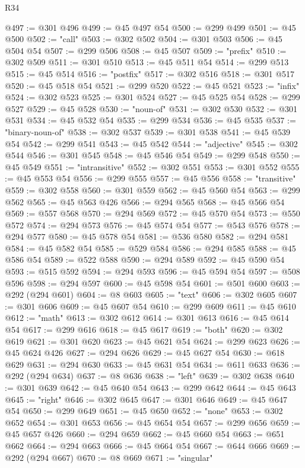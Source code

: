 \begin{lexlean}{R34}
\begin{coremodule}
@497 := @301 @496
@499 := @45 @497 @54
@500 := @299 @499
@501 := @45 @500
@502 := "call"
@503 := @302 @502
@504 := @301 @503
@506 := @45 @504 @54
@507 := @299 @506
@508 := @45 @507
@509 := "prefix"
@510 := @302 @509
@511 := @301 @510
@513 := @45 @511 @54
@514 := @299 @513
@515 := @45 @514
@516 := "postfix"
@517 := @302 @516
@518 := @301 @517
@520 := @45 @518 @54
@521 := @299 @520
@522 := @45 @521
@523 := "infix"
@524 := @302 @523
@525 := @301 @524
@527 := @45 @525 @54
@528 := @299 @527
@529 := @45 @528
@530 := "noun-of"
@531 := @302 @530
@532 := @301 @531
@534 := @45 @532 @54
@535 := @299 @534
@536 := @45 @535
@537 := "binary-noun-of"
@538 := @302 @537
@539 := @301 @538
@541 := @45 @539 @54
@542 := @299 @541
@543 := @45 @542
@544 := "adjective"
@545 := @302 @544
@546 := @301 @545
@548 := @45 @546 @54
@549 := @299 @548
@550 := @45 @549
@551 := "intransitive"
@552 := @302 @551
@553 := @301 @552
@555 := @45 @553 @54
@556 := @299 @555
@557 := @45 @556
@558 := "transitive"
@559 := @302 @558
@560 := @301 @559
@562 := @45 @560 @54
@563 := @299 @562
@565 := @45 @563 @426
@566 := @294 @565
@568 := @45 @566 @54
@569 := @557 @568
@570 := @294 @569
@572 := @45 @570 @54
@573 := @550 @572
@574 := @294 @573
@576 := @45 @574 @54
@577 := @543 @576
@578 := @294 @577
@580 := @45 @578 @54
@581 := @536 @580
@582 := @294 @581
@584 := @45 @582 @54
@585 := @529 @584
@586 := @294 @585
@588 := @45 @586 @54
@589 := @522 @588
@590 := @294 @589
@592 := @45 @590 @54
@593 := @515 @592
@594 := @294 @593
@596 := @45 @594 @54
@597 := @508 @596
@598 := @294 @597
@600 := @45 @598 @54
@601 := @501 @600
@603 := @292 (@294 @601)
@604 := @8 @603
@605 := "text"
@606 := @302 @605
@607 := @301 @606
@609 := @45 @607 @54
@610 := @299 @609
@611 := @45 @610
@612 := "math"
@613 := @302 @612
@614 := @301 @613
@616 := @45 @614 @54
@617 := @299 @616
@618 := @45 @617
@619 := "both"
@620 := @302 @619
@621 := @301 @620
@623 := @45 @621 @54
@624 := @299 @623
@626 := @45 @624 @426
@627 := @294 @626
@629 := @45 @627 @54
@630 := @618 @629
@631 := @294 @630
@633 := @45 @631 @54
@634 := @611 @633
@636 := @292 (@294 @634)
@637 := @8 @636
@638 := "left"
@639 := @302 @638
@640 := @301 @639
@642 := @45 @640 @54
@643 := @299 @642
@644 := @45 @643
@645 := "right"
@646 := @302 @645
@647 := @301 @646
@649 := @45 @647 @54
@650 := @299 @649
@651 := @45 @650
@652 := "none"
@653 := @302 @652
@654 := @301 @653
@656 := @45 @654 @54
@657 := @299 @656
@659 := @45 @657 @426
@660 := @294 @659
@662 := @45 @660 @54
@663 := @651 @662
@664 := @294 @663
@666 := @45 @664 @54
@667 := @644 @666
@669 := @292 (@294 @667)
@670 := @8 @669
@671 := "singular"

\end{coremodule}
\end{lexlean}

